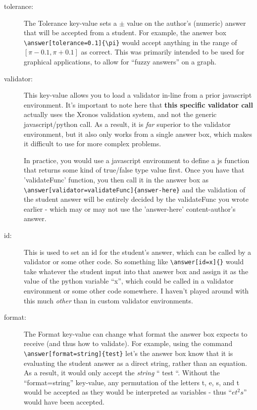 \documentclass{ximera}
\begin{document}
\begin{description}
    \item[tolerance:] The Tolerance key-value sets a $\pm$ value on the author's (numeric) answer that will be accepted from a student. For example, the answer box \verb|\answer[tolerance=0.1]{\pi}| would accept anything in the range of $[\pi-0.1,\pi+0.1]$ as correct. This was primarily intended to be used for graphical applications, to allow for ``fuzzy answers'' on a graph.
    
    \item[validator:] This key-value allows you to load a validator in-line from a prior javascript environment. It's important to note here that \textbf{this specific validator call} actually uses the Xronos validation system, and not the generic javascript/python call. As a result, it is \textit{far} superior to the validator environment, but it also only works from a single answer box, which makes it difficult to use for more complex problems. 
    
    In practice, you would use a javascript environment to define a js function that returns some kind of true/false type value first. Once you have that 'validateFunc' function, you then call it in the answer box as \verb|\answer[validator=validateFunc]{answer-here}| and the validation of the student answer will be entirely decided by the validateFunc you wrote earlier - which may or may not use the 'answer-here' content-author's answer.
    
    \item[id:] This is used to set an id for the student's answer, which can be called by a validator or some other code. So something like \verb|\answer[id=x]{}| would take whatever the student input into that answer box and assign it as the value of the python variable ``x'', which could be called in a validator environment or some other code somewhere. I haven't played around with this much \textit{other} than in custom validator environments.
    
    \item[format:] The Format key-value can change what format the answer box expects to receive (and thus how to validate). For example, using the command \verb|\answer[format=string]{test}| let's the answer box know that it is evaluating the student answer as a direct string, rather than an equation. As a result, it would only accept the \textit{string} `` test ``. Without the ``format=string'' key-value, any permutation of the letters t, e, s, and t would be accepted as they would be interpreted as variables - thus ``$et^2s$'' would have been accepted. 
    

\end{description}
\end{document}
